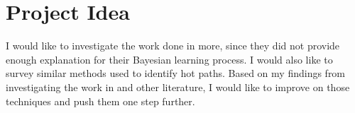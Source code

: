 \documentclass[11pt,a4paper]{article}
\begin{document}
\section{Project Idea}
I would like to investigate the work done in \cite{buse2009road} more, since they did not provide enough explanation for their Bayesian learning process. I
would also like to survey similar methods used to identify hot paths. Based on my findings from investigating the work in \cite{buse2009road} and other
literature, I would like to improve on those techniques and push them one step further.



\nocite{*}
\end{document}
